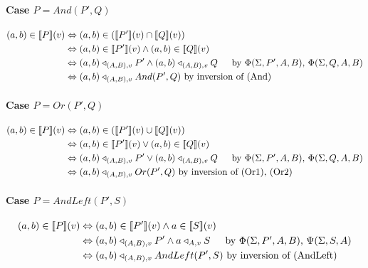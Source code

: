 \documentclass[12pt,a4paper,twoside,openright]{report}
\newcommand{\db}[1]{{\bf [\![}#1{\bf ]\!]}}
\newcommand{\deno}[1]{\db{#1}(v)}
\newcommand{\denoRule}[2]{#1 \in \deno{#2}}
\newcommand{\opRule}[3]{#1 \triangleleft_{#2, v} #3}
\newcommand{\phiRule}[3]{\Phi(\Sigma, #1, #2, #3)}
\newcommand{\psiRule}[2]{\Psi(\Sigma, #1, #2)}
\begin{document}
{{\paragraph{Case $P = And(P', Q)$}
\begin{equation} \label{case And(P', Q)}
\begin{split}
\denoRule{(a, b)}{P} & \Leftrightarrow (a, b) \in (\deno{P'} \cap \deno{Q})\\
					& \Leftrightarrow \denoRule{(a, b)}{P'} \wedge \denoRule{(a, b)}{Q}\\
					&\Leftrightarrow \opRule{(a,b)}{(A, B)}{P'} \wedge \opRule{(a,b)}{(A, B)}{Q}\indent\mbox{by $\phiRule{P'}{A}{B}$, $\phiRule{Q}{A}{B}$} \\
					& \Leftrightarrow \opRule{(a, b)}{(A, B)}{And(P', Q)} \mbox{ by inversion of (And)}\\
\end{split}
\end{equation}

\paragraph{Case $P = Or(P', Q)$}
\begin{equation} \label{case Or(P', Q)}
\begin{split}
\denoRule{(a, b)}{P} & \Leftrightarrow (a, b) \in (\deno{P'} \cup \deno{Q})\\
					& \Leftrightarrow \denoRule{(a, b)}{P'} \vee \denoRule{(a, b)}{Q}\\
					&\Leftrightarrow \opRule{(a,b)}{(A, B)}{P'} \vee \opRule{(a,b)}{(A, B)}{Q}\indent\mbox{by $\phiRule{P'}{A}{B}$, $\phiRule{Q}{A}{B}$} \\
					& \Leftrightarrow \opRule{(a, b)}{(A, B)}{Or(P', Q)} \mbox{ by inversion of (Or1), (Or2)}\\\end{split}
\end{equation}

\paragraph{Case $P = AndLeft(P', S)$}
\begin{equation} \label{case AndLeft(P', Q)}
\begin{split}
\denoRule{(a, b)}{P} & \Leftrightarrow \denoRule{(a, b)}{P'} \wedge \denoRule{a}{S}\\
					&\Leftrightarrow \opRule{(a,b)}{(A, B)}{P'} \wedge \opRule{a}{A}{S}\indent\mbox{by $\phiRule{P'}{A}{B}$, $\psiRule{S}{A}$} \\
					& \Leftrightarrow \opRule{(a, b)}{(A, B)}{AndLeft(P', S)} \mbox{ by inversion of (AndLeft)}\\\end{split}
\end{equation}

}}
\end{document}
